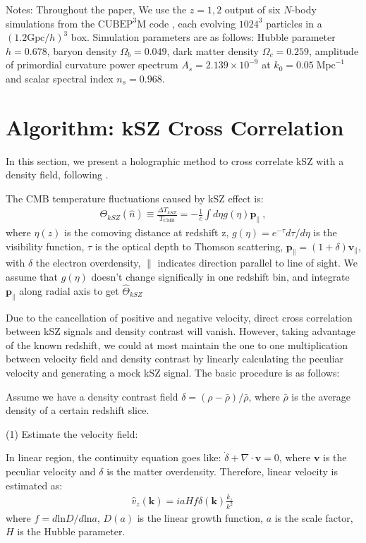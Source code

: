 \documentclass[aps,prd,twocolumn,showpacs,superscriptaddress,groupedaddress,nofootinbib]{revtex4}  %
\newcommand{\mr}{\mathrm}
\begin{document}
Notes: 
Throughout the paper, We use the $z=1,2$ output of six $N$-body simulations from the
$\mr{CUBEP}^3\mr{M}$ code \cite{2013:code}, each evolving $1024^3$ particles in a $(1.2\mr{Gpc}/h)^3$ box. 
Simulation parameters are as follows: Hubble parameter $h=0.678$, baryon
density $\Omega_{b}=0.049$, dark matter density $\Omega_{c}=0.259$,
amplitude of primordial curvature power spectrum $A_s=2.139\times10^{-9}$ at 
$k_0=0.05\;\mr{Mpc}^{-1}$ and scalar spectral index $n_s=0.968$.


\section{Algorithm: kSZ Cross Correlation}
In this section, we present a holographic method 
to cross correlate kSZ with a density field, 
following \cite{Shao11}. 

\label{sec:kszRecon}
The CMB temperature fluctuations caused by kSZ effect is:
\begin{eqnarray}
\label{eq:ksz}
\Theta_{kSZ}(\hat n)\equiv\frac{\Delta T_{kSZ}}{T_{\mr{CMB}}}
=-\frac{1}{c}\int d\eta  g(\eta)  \bm{p}_\parallel\ ,
\end{eqnarray}
where $\eta(z)$ is the comoving distance at redshift z, $g(\eta)=e^{-\tau} d\tau/d\eta$ is the visibility function, $\tau$ is the optical depth to Thomson scattering, $\bm{p}_\parallel=(1+\delta)\bm{v}_\parallel$, with $\delta$ the electron overdensity, $\parallel$ indicates direction parallel to line of sight. 
We assume that $g(\eta)$ doesn't change significally in one redshift bin, 
and integrate $\bm{p}_\parallel$ along radial axis to get $\hat \Theta_{kSZ}$

Due to the cancellation of positive and negative velocity, direct cross correlation between kSZ signals and density contrast will vanish.
However, taking advantage of the known redshift, 
we could at most maintain the one to one multiplication between velocity field and density contrast   
by linearly calculating the peculiar velocity 
and generating a mock kSZ signal. 
The basic procedure is as follows:

Assume we have a density contrast field $\delta=(\rho-\bar{\rho})/\bar{\rho}$, where $\bar\rho$ is the average density of a certain redshift slice. 

(1) Estimate the velocity field:

In linear region, the continuity equation goes like:
$\dot \delta+\nabla \cdot \bm{v}=0$, 
where $\bm{v}$ is the peculiar velocity and $\delta$ is the matter overdensity. 
Therefore, linear velocity is estimated as: 
\begin{eqnarray}
	\label{eq:v}
\hat v_z(\bm{k})=i a H f\delta(\bm{k})\frac{k_z}{k^2}\,
\end{eqnarray}
where $f=d\mathrm{ln}D/d\mathrm{ln}a$, $D(a)$ is the linear growth function, 
$a$ is the scale factor, $H$ is the Hubble parameter.
\end{document}

